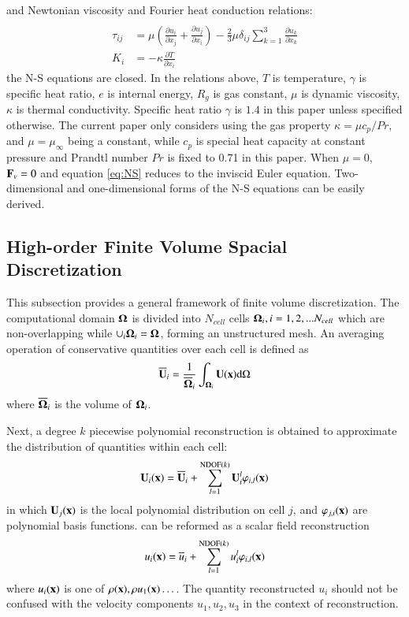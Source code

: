 \documentclass[preprint,12pt]{elsarticle}
\begin{document}
and Newtonian viscosity and Fourier
heat conduction relations:
\begin{equation}
    \begin{aligned}
        \\
        \tau_{ij} & =
        \mu\left(\frac{\partial u_i}{\partial x_j} + \frac{\partial u_j}{\partial x_i}\right)
        -
        \frac{2}{3}\mu \delta_{ij}\sum_{k=1}^{3}{\frac{\partial u_k}{\partial x_k}} \\
        K_i       & = - \kappa \frac{\partial T}{\partial x_i}
    \end{aligned}
\end{equation}
the N-S equations are closed.
In the relations above, $T$ is temperature,
$\gamma$ is specific heat ratio, $e$ is internal energy,
$R_g$ is  gas constant, $\mu$ is dynamic viscosity,
$\kappa$ is thermal conductivity.
Specific heat ratio $\gamma$ is $1.4$ in this paper unless specified
otherwise.
The current paper only
considers using the gas property $\kappa = \mu c_p / Pr$,
and $\mu=\mu_{\infty}$ being a constant,
while $c_p$ is special heat capacity
at constant pressure and
Prandtl number $Pr$ is fixed to 0.71 in this paper.
When $\mu=0$,
$\mathbf{F}_v=0$ and
equation \eqref{eq:NS} reduces to
the inviscid Euler equation.
Two-dimensional and one-dimensional forms of the N-S equations
can be easily derived.

\subsection{High-order Finite Volume Spacial Discretization}
\label{ssec:FV}




This subsection provides a general framework of
finite volume discretization.
The computational domain $\mathbf{\Omega}$ is divided
into $N_{cell}$ cells $\mathbf{\Omega}_i, i=1,2,...N_{cell}$ which
are non-overlapping while $\cup_i{\mathbf{\Omega}_i} = \mathbf{\Omega}$,
forming an unstructured mesh.
An averaging operation of conservative quantities
over each cell is defined as
\begin{equation}
    \label{eq:FVMean}
    \overline{\mathbf{U}}_i = \frac{1}{\overline{\mathbf{\Omega}}_i}\int_{\mathbf{\Omega}_i}\mathbf{U}(\mathbf{x})\dd \Omega
\end{equation}
where $\overline{\mathbf{\Omega}}_i$ is the volume of $\mathbf{\Omega}_i$.

Next, a degree $k$ piecewise polynomial reconstruction is
obtained to approximate the distribution of
quantities within each cell:
\begin{equation}
    \label{eq:FVRec}
    \mathbf{U}_i(\mathbf{x}) = \overline{\mathbf{U}}_i + \sum_{l=1}^{\mathrm{NDOF}(k)}{\mathbf{U}_i^l\varphi_{i,l}(\mathbf{x}) }
\end{equation}
in which
$\mathbf{U}_j(\mathbf{x})$ is the local polynomial distribution on cell $j$,
and
$\varphi_{j,i}(\mathbf{x})$ are
polynomial basis functions.
 can be reformed as a scalar field reconstruction
\begin{equation}
    \label{eq:FVRecScalar}
    u_i(\mathbf{x}) = \overline{u}_i + \sum_{l=1}^{\mathrm{NDOF}(k)}{u_i^l\varphi_{i,l}(\mathbf{x}) }
\end{equation}
where $u_i(\mathbf{x})$ is one of $\rho(\mathbf{x}), \rho u_1(\mathbf{x})\dots$.
The quantity reconstructed $u_i$ should not
be confused with the velocity components $u_1, u_2, u_3$ in the context of
reconstruction.
\end{document}
